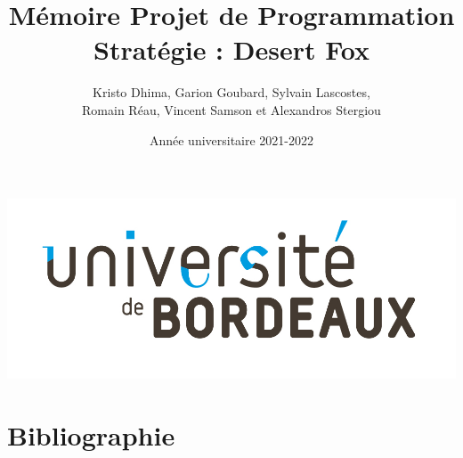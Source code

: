 \documentclass{article}[a4paper, 12pt]
\title{\LARGE \textbf{Mémoire Projet de Programmation  } \\ \Large \textbf{Stratégie : Desert Fox}}
\author{Kristo Dhima, Garion Goubard, Sylvain Lascostes, \\Romain Réau, Vincent Samson et Alexandros Stergiou }
\date{Année universitaire 2021-2022}
\begin{document}
\maketitle
\begin{center}
    \center
    \includegraphics[scale=0.2]{data/Universite_Bordeaux_RVB-10.jpg}

\end{center}





\newpage
\tableofcontents %


\newpage



\newpage


\newpage







\section{Bibliographie}





\end{document}
